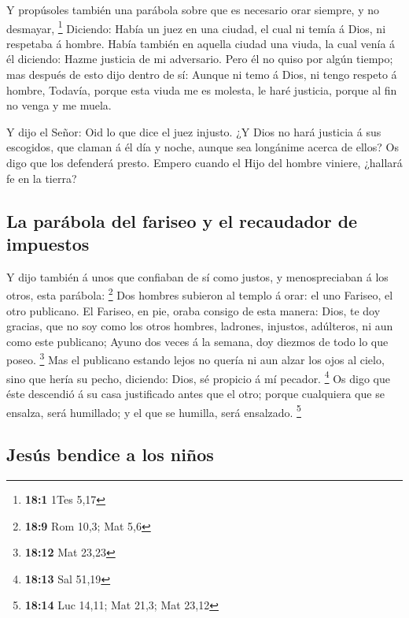  Y propúsoles también una parábola sobre que es necesario
orar siempre, y no desmayar, \footnote{\textbf{18:1} 1Tes 5,17}
 Diciendo: Había un juez en una ciudad, el cual ni temía á
Dios, ni respetaba á hombre.  Había también en aquella
ciudad una viuda, la cual venía á él diciendo: Hazme justicia de mi
adversario.  Pero él no quiso por algún tiempo; mas
después de esto dijo dentro de sí: Aunque ni temo á Dios, ni tengo
respeto á hombre,  Todavía, porque esta viuda me es
molesta, le haré justicia, porque al fin no venga y me muela.

 Y dijo el Señor: Oid lo que dice el juez injusto.
 ¿Y Dios no hará justicia á sus escogidos, que claman á él
día y noche, aunque sea longánime acerca de ellos?  Os
digo que los defenderá presto. Empero cuando el Hijo del hombre viniere,
¿hallará fe en la tierra?

\hypertarget{la-paruxe1bola-del-fariseo-y-el-recaudador-de-impuestos}{%
\subsection{La parábola del fariseo y el recaudador de
impuestos}\label{la-paruxe1bola-del-fariseo-y-el-recaudador-de-impuestos}}

 Y dijo también á unos que confiaban de sí como justos, y
menospreciaban á los otros, esta parábola: \footnote{\textbf{18:9} Rom
  10,3; Mat 5,6}  Dos hombres subieron al templo á orar:
el uno Fariseo, el otro publicano.  El Fariseo, en pie,
oraba consigo de esta manera: Dios, te doy gracias, que no soy como los
otros hombres, ladrones, injustos, adúlteros, ni aun como este
publicano;  Ayuno dos veces á la semana, doy diezmos de
todo lo que poseo. \footnote{\textbf{18:12} Mat 23,23} 
Mas el publicano estando lejos no quería ni aun alzar los ojos al cielo,
sino que hería su pecho, diciendo: Dios, sé propicio á mí pecador.
\footnote{\textbf{18:13} Sal 51,19}  Os digo que éste
descendió á su casa justificado antes que el otro; porque cualquiera que
se ensalza, será humillado; y el que se humilla, será ensalzado.
\footnote{\textbf{18:14} Luc 14,11; Mat 21,3; Mat 23,12}

\hypertarget{jesuxfas-bendice-a-los-niuxf1os}{%
\subsection{Jesús bendice a los
niños}\label{jesuxfas-bendice-a-los-niuxf1os}}

